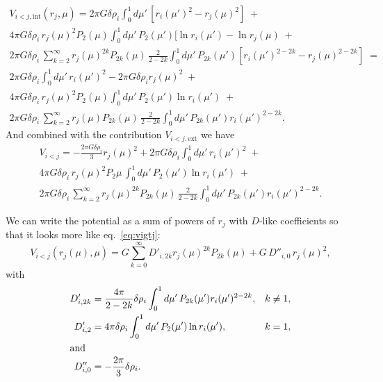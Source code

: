 \documentclass[amsmath,amsfonts,rmp,letterpaper]{revtex4}
\renewcommand{\inf}{\infty}
\newcommand{\ptk}{P_{2k}}
\newcommand{\dro}{\delta\rho}
\newcommand{\mupint}{\int_{0}^{1}d\mu'\,}
\newcommand{\tpi}{2\pi}
\begin{document}
\begin{multline}\label{eq:viltjint}
V_{i<j,\mathrm{int}}(r_j,\mu) =
\tpi{G}\dro_i\mupint[r_i(\mu')^2 - r_j(\mu)^2]\; +\\
4\pi{G}\dro_i\,r_j(\mu)^2{}P_2(\mu)\mupint{}P_2(\mu')[\ln{r_i(\mu')} -
\ln{r_j(\mu)}\; + \\
\tpi{G}\dro_i\,\sum_{k=2}^{\inf}r_j(\mu)^{2k}\ptk(\mu)\,\frac{2}{2 -2k}
\mupint\ptk(\mu')[r_i(\mu')^{2 - 2k} - r_j(\mu)^{2 - 2k}]\; = \\
\tpi{G}\dro_i\mupint{}r_i(\mu')^2 - \tpi{G}\dro_i{}r_j(\mu)^2\; + \\ 
4\pi{G}\dro_i\,r_j(\mu)^2{}P_2(\mu)\mupint{}P_2(\mu')\ln{r_i(\mu')}\; + \\
2\pi{G}\dro_i\,\sum_{k=2}^{\inf}r_j(\mu)\ptk(\mu)\,\frac{2}{2 - 2k}
\mupint\ptk(\mu')r_i(\mu')^{2 - 2k}.
\end{multline}
And combined with the contribution $V_{i<j,\mathrm{ext}}$ we have
\begin{multline}
V_{i<j} = -\frac{2\pi{G}\dro_i}{3}r_j(\mu)^2 +
2\pi{G}\dro_i\mupint{}r_i(\mu')^2\; + \\
4\pi{G}\dro_i\,r_j(\mu)^2P_2{\mu}\,\mupint{}P_2(\mu')\ln{r_i(\mu')}\; + \\
2\pi{G}\dro_i\,\sum_{k=2}^{\inf}r_j(\mu)^{2k}\ptk(\mu)\,
\frac{2}{2 - 2k}\mupint\ptk(\mu')r_i(\mu')^{2 - 2k}.
\end{multline}

We can write the potential as a sum of powers of $r_j$ with $D$-like coefficients
so that it looks more like eq.~\eqref{eq:vigtj}:
\begin{equation}\label{eq:viltj}
V_{i<j}(r_j(\mu),\mu) = G\sum_{k=0}^{\inf}D'_{i,2k}r_j(\mu)^{2k}\ptk(\mu) + 
G\,D''_{i,0}\,r_j(\mu)^2,
\end{equation}
with
\begin{subequations}
\begin{align}
D'_{i,2k} &= \frac{4\pi}{2 - 2k}\dro_i
\mupint\ptk(\mu')r_i(\mu')^{2 - 2k}, & k\ne{1},\\
D'_{i,2} &= 4\pi\dro_i\mupint{}P_2(\mu')\ln{r_i(\mu')}, & k=1,\\
\intertext{and}
D''_{i,0} &= -\frac{2\pi}{3}\dro_i.
\end{align}
\end{subequations}
\end{document}
